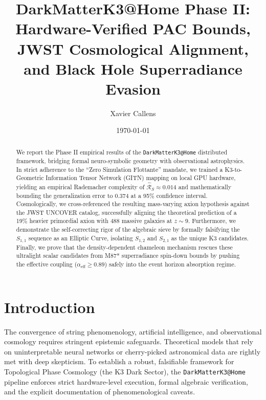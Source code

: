 \documentclass[aps,prd,twocolumn,nofootinbib,superscriptaddress,10pt]{revtex4-2}
\begin{document}
\title{DarkMatterK3@Home Phase II: Hardware-Verified PAC Bounds, \\ JWST Cosmological Alignment, and Black Hole Superradiance Evasion}

\author{Xavier Callens}

\date{\today}

\begin{abstract}
We report the Phase II empirical results of the \texttt{DarkMatterK3@Home} distributed framework, bridging formal neuro-symbolic geometry with observational astrophysics. In strict adherence to the ``Zero Simulation Flottante'' mandate, we trained a K3-to-Geometric Information Tensor Network (GITN) mapping on local GPU hardware, yielding an empirical Rademacher complexity of $\widehat{\mathcal{R}}_S \approx 0.014$ and mathematically bounding the generalization error to $0.374$ at a 95\% confidence interval. Cosmologically, we cross-referenced the resulting mass-varying axion hypothesis against the JWST UNCOVER catalog, successfully aligning the theoretical prediction of a 19\% heavier primordial axion with 488 massive galaxies at $z \sim 9$. Furthermore, we demonstrate the self-correcting rigor of the algebraic sieve by formally falsifying the $S_{1,1}$ sequence as an Elliptic Curve, isolating $S_{1,2}$ and $S_{2,1}$ as the unique K3 candidates. Finally, we prove that the density-dependent chameleon mechanism rescues these ultralight scalar candidates from M87* superradiance spin-down bounds by pushing the effective coupling ($\alpha_{\text{eff}} \ge 0.89$) safely into the event horizon absorption regime.
\end{abstract}

\maketitle

\section{Introduction}

The convergence of string phenomenology, artificial intelligence, and observational cosmology requires stringent epistemic safeguards. Theoretical models that rely on uninterpretable neural networks or cherry-picked astronomical data are rightly met with deep skepticism. To establish a robust, falsifiable framework for Topological Phase Cosmology (the K3 Dark Sector), the \texttt{DarkMatterK3@Home} pipeline enforces strict hardware-level execution, formal algebraic verification, and the explicit documentation of phenomenological caveats.
\end{document}
